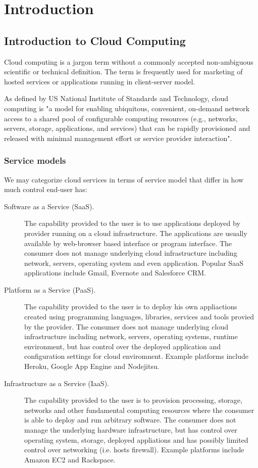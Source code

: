 \chapter{Introduction}
\label{chap:introduction} 


\section{Introduction to Cloud Computing}

Cloud computing is a jargon term without a commonly accepted non-ambiguous scientific or technical definition. The term is frequently used for marketing of hosted services or applications running in client-server model. 

As defined by US National Institute of Standards and Technology\cite{NISTCloudDef}, cloud computing is "a model for enabling ubiquitous, convenient, on-demand network access to a shared pool of configurable computing resources (e.g., networks, servers, storage, applications, and services) that can be rapidly provisioned and released with minimal management effort or service provider interaction".

\subsection{Service models}

We may categorize cloud services in terms of service model that differ in how much control end-user has:

\begin{description}
  \item[Software as a Service (SaaS).] The capability provided to the user is to use applications deployed by provider running on a cloud infrastructure. The applications are usually available by web-browser based interface or program interface. The consumer does not manage underlying cloud infrastructure including network, servers, operating system and even application. Popular SaaS applications include Gmail, Evernote and Salesforce CRM.
  \item[Platform as a Service (PaaS).] The capability provided to the user is to deploy his own appliactions created using programming languages, libraries, services and tools provied by the provider. The consumer does not manage underlying cloud infrastructure including network, servers, operating systems, runtime environment, but has control over the deployed application and configuration settings for cloud enviromnent. Example platforms include Heroku, Google App Engine and Nodejitsu.
  \item[Infrastructure as a Service (IaaS).] The capability provided to the user is to provision processing, storage, networks and other fundamental computing resources where the consumer is able to deploy and run arbitrary software. The consumer does not manage the underlying hardware infrastructure, but has control over operating system, storage, deployed appliations and has possibly limited control over networking (i.e. hosts firewall). Example platforms include Amazon EC2 and Rackspace.
\end{description}

